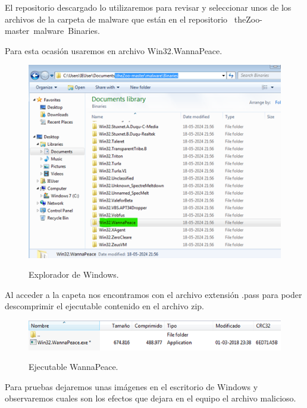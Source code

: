 \documentclass[stu, 11pt, letterpaper, donotrepeattitle, floatsintext, natbib]{apa7}
\begin{document}
El repositorio descargado lo utilizaremos para revisar y seleccionar unos de los archivos de la carpeta de malware que están en el repositorio \ theZoo-master\ malware\ Binaries.

 Para esta ocasión usaremos en archivo Win32.WannaPeace.

\begin{figure}[H]
    \centering
    \caption{Explorador de Windows.}
    \includegraphics[width=0.75\linewidth]{ram2.png} %
    \label{fig:OverallEffect}
\end{figure}

Al acceder a la capeta nos encontramos con el archivo extensión .pass  para poder descomprimir el ejecutable contenido en el archivo zip.

\begin{figure}[H]
    \centering
    \caption{Ejecutable WannaPeace.}
    \includegraphics[width=0.75\linewidth]{ram3.png} %
    \label{fig:OverallEffect}
\end{figure}

Para pruebas dejaremos unas imágenes en el escritorio de Windows y observaremos cuales son los efectos que dejara en el equipo el archivo malicioso.
\end{document}
